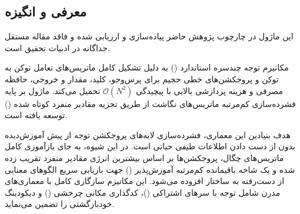 \subsection{معرفی و انگیزه}
این ماژول در چارچوب پژوهش حاضر پیاده‌سازی و ارزیابی شده و فاقد مقاله مستقل جداگانه در ادبیات تحقیق است.

مکانیزم توجه چندسره استاندارد () به دلیل تشکیل کامل ماتریس‌های تعامل توکن به توکن و پروجکشن‌های خطی حجیم برای پرس‌وجو، کلید، مقدار و خروجی، حافظه مصرفی و هزینه پردازشی بالایی با پیچیدگی $\mathcal{O}(N^2)$ تحمیل می‌کند. ماژول  بر پایه فشرده‌سازی کم‌مرتبه ماتریس‌های نگاشت از طریق تجزیه مقادیر منفرد کوتاه شده () توسعه یافته است.

هدف بنیادین این معماری، فشرده‌سازی لایه‌های پروجکشن توجه از پیش آموزش‌دیده بدون از دست دادن اطلاعات طیفی حیاتی است. در این شیوه، به جای بازآموزی کامل ماتریس‌های چگال، پروجکشن‌ها بر اساس بیشترین انرژی مقادیر منفرد تقریب زده شده و یک شاخه باقیمانده کم‌مرتبه آموزش‌پذیر () جهت بازیابی سریع الگوهای معنایی از دست‌رفته به ساختار افزوده می‌شود. این مکانیزم سازگاری کامل با معماری‌های مدرن شامل توجه با سرهای اشتراکی ()، کدگذاری مکانی چرخشی () و دیکودینگ خودبازگشتی را تضمین می‌نماید.
